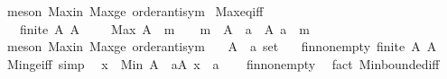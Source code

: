 \begin{isabellebody}
%
\isadelimproof
%
\endisadelimproof
%
\isatagproof
{}\isamarkupfalse%
\ {\isacharparenleft}{\kern0pt}meson\ Max{\isacharunderscore}{\kern0pt}in\ Max{\isacharunderscore}{\kern0pt}ge\ order{\isachardot}{\kern0pt}antisym{\isacharparenright}{\kern0pt}%
\endisatagproof
{\isafoldproof}%
%
\isadelimproof
\isanewline
%
\endisadelimproof
\isanewline
{}\isamarkupfalse%
\ Max{\isacharunderscore}{\kern0pt}eq{\isacharunderscore}{\kern0pt}iff{\isacharcolon}{\kern0pt}\isanewline
\ \ {\isachardoublequoteopen}{\isasymlbrakk}\ finite\ A{\isacharsemicolon}{\kern0pt}\ A\ {\isasymnoteq}\ {\isacharbraceleft}{\kern0pt}{\isacharbraceright}{\kern0pt}\ {\isasymrbrakk}\ {\isasymLongrightarrow}\ Max\ A\ {\isacharequal}{\kern0pt}\ m\ \ {\isasymlongleftrightarrow}\ \ m\ {\isasymin}\ A\ {\isasymand}\ {\isacharparenleft}{\kern0pt}{\isasymforall}a\ {\isasymin}\ A{\isachardot}{\kern0pt}\ a\ {\isasymle}\ m{\isacharparenright}{\kern0pt}{\isachardoublequoteclose}\isanewline
%
\isadelimproof
%
\endisadelimproof
%
\isatagproof
{}\isamarkupfalse%
\ {\isacharparenleft}{\kern0pt}meson\ Max{\isacharunderscore}{\kern0pt}in\ Max{\isacharunderscore}{\kern0pt}ge\ order{\isachardot}{\kern0pt}antisym{\isacharparenright}{\kern0pt}%
\endisatagproof
{\isafoldproof}%
%
\isadelimproof
\isanewline
%
\endisadelimproof
\isanewline
{}\isamarkupfalse%
\isanewline
\ \ \ A\ {\isacharcolon}{\kern0pt}{\isacharcolon}{\kern0pt}\ {\isachardoublequoteopen}{\isacharprime}{\kern0pt}a\ set{\isachardoublequoteclose}\isanewline
\ \ \ fin{\isacharunderscore}{\kern0pt}nonempty{\isacharcolon}{\kern0pt}\ {\isachardoublequoteopen}finite\ A{\isachardoublequoteclose}\ {\isachardoublequoteopen}A\ {\isasymnoteq}\ {\isacharbraceleft}{\kern0pt}{\isacharbraceright}{\kern0pt}{\isachardoublequoteclose}\isanewline
{}\isanewline
\isanewline
{}\isamarkupfalse%
\ Min{\isacharunderscore}{\kern0pt}ge{\isacharunderscore}{\kern0pt}iff\ {\isacharbrackleft}{\kern0pt}simp{\isacharbrackright}{\kern0pt}{\isacharcolon}{\kern0pt}\isanewline
\ \ {\isachardoublequoteopen}x\ {\isasymle}\ Min\ A\ {\isasymlongleftrightarrow}\ {\isacharparenleft}{\kern0pt}{\isasymforall}a{\isasymin}A{\isachardot}{\kern0pt}\ x\ {\isasymle}\ a{\isacharparenright}{\kern0pt}{\isachardoublequoteclose}\isanewline
%
\isadelimproof
\ \ %
\endisadelimproof
%
\isatagproof
{}\isamarkupfalse%
\ fin{\isacharunderscore}{\kern0pt}nonempty\ \isamarkupfalse%
\ {\isacharparenleft}{\kern0pt}fact\ Min{\isachardot}{\kern0pt}bounded{\isacharunderscore}{\kern0pt}iff{\isacharparenright}{\kern0pt}%

\end{isabellebody}
